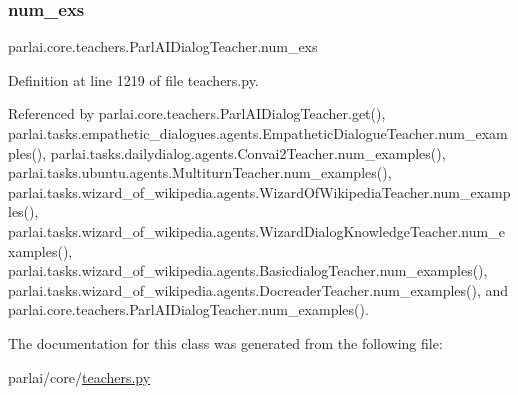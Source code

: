 \subsubsection{\texorpdfstring{num\+\_\+exs}{num\_exs}}
{\footnotesize\ttfamily parlai.\+core.\+teachers.\+Parl\+A\+I\+Dialog\+Teacher.\+num\+\_\+exs}



Definition at line 1219 of file teachers.\+py.



Referenced by parlai.\+core.\+teachers.\+Parl\+A\+I\+Dialog\+Teacher.\+get(), parlai.\+tasks.\+empathetic\+\_\+dialogues.\+agents.\+Empathetic\+Dialogue\+Teacher.\+num\+\_\+examples(), parlai.\+tasks.\+dailydialog.\+agents.\+Convai2\+Teacher.\+num\+\_\+examples(), parlai.\+tasks.\+ubuntu.\+agents.\+Multiturn\+Teacher.\+num\+\_\+examples(), parlai.\+tasks.\+wizard\+\_\+of\+\_\+wikipedia.\+agents.\+Wizard\+Of\+Wikipedia\+Teacher.\+num\+\_\+examples(), parlai.\+tasks.\+wizard\+\_\+of\+\_\+wikipedia.\+agents.\+Wizard\+Dialog\+Knowledge\+Teacher.\+num\+\_\+examples(), parlai.\+tasks.\+wizard\+\_\+of\+\_\+wikipedia.\+agents.\+Basicdialog\+Teacher.\+num\+\_\+examples(), parlai.\+tasks.\+wizard\+\_\+of\+\_\+wikipedia.\+agents.\+Docreader\+Teacher.\+num\+\_\+examples(), and parlai.\+core.\+teachers.\+Parl\+A\+I\+Dialog\+Teacher.\+num\+\_\+examples().



The documentation for this class was generated from the following file\+:\begin{DoxyCompactItemize}
\item 
parlai/core/\hyperlink{teachers_8py}{teachers.\+py}\end{DoxyCompactItemize}
